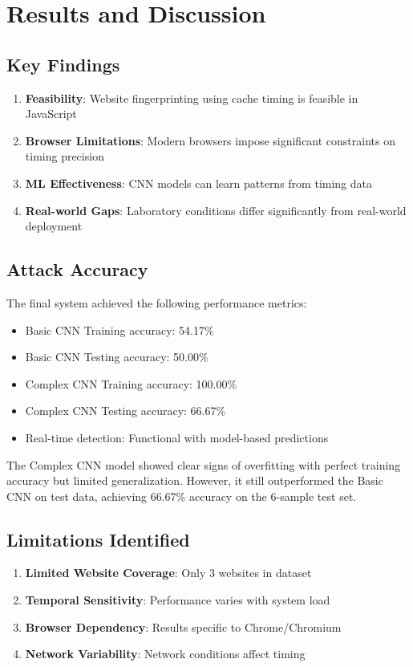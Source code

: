 \documentclass[11pt,a4paper]{article}
\begin{document}
\section{Results and Discussion}

\subsection{Key Findings}
\begin{enumerate}
    \item \textbf{Feasibility}: Website fingerprinting using cache timing is feasible in JavaScript
    \item \textbf{Browser Limitations}: Modern browsers impose significant constraints on timing precision
    \item \textbf{ML Effectiveness}: CNN models can learn patterns from timing data
    \item \textbf{Real-world Gaps}: Laboratory conditions differ significantly from real-world deployment
\end{enumerate}

\subsection{Attack Accuracy}
The final system achieved the following performance metrics:
\begin{itemize}
    \item Basic CNN Training accuracy: 54.17\%
    \item Basic CNN Testing accuracy: 50.00\%
    \item Complex CNN Training accuracy: 100.00\%
    \item Complex CNN Testing accuracy: 66.67\%
    \item Real-time detection: Functional with model-based predictions
\end{itemize}

The Complex CNN model showed clear signs of overfitting with perfect training accuracy but limited generalization. However, it still outperformed the Basic CNN on test data, achieving 66.67\% accuracy on the 6-sample test set.

\subsection{Limitations Identified}
\begin{enumerate}
    \item \textbf{Limited Website Coverage}: Only 3 websites in dataset
    \item \textbf{Temporal Sensitivity}: Performance varies with system load
    \item \textbf{Browser Dependency}: Results specific to Chrome/Chromium
    \item \textbf{Network Variability}: Network conditions affect timing
\end{enumerate}
\end{document}
